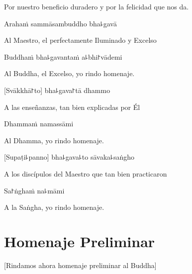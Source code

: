 \begin{english}
Por nuestro beneficio duradero y por la felicidad que nos da.
\end{english}

\clearpage

Arahaṁ sammāsambuddho bha꜕gavā

\begin{english}
Al Maestro, el perfectamente Iluminado y Excelso
\end{english}

Buddhaṁ bha꜕gavantaṁ a꜕bhi꜓vādemi

\begin{english}
  Al Buddha, el Excelso, yo rindo homenaje.
\end{english}

[Svākkhā꜓to] bha꜕gava꜓tā dhammo

\begin{english}
 A las enseñanzas, tan bien explicadas por Él 
\end{english}

Dhammaṁ namassāmi

\begin{english}
  Al Dhamma, yo rindo homenaje.
\end{english}

[Supaṭi꜕panno] bha꜕gava꜕to sāvaka꜕saṅgho

\begin{english}
A los discípulos del Maestro que tan bien practicaron
\end{english}

Sa꜓ṅghaṁ na꜕māmi

\begin{english}
  A la Saṅgha, yo rindo homenaje.
\end{english}

\chapter{Homenaje Preliminar}

\begin{leader}
\end{leader}

\begin{english}
  [Rindamos ahora homenaje preliminar al Buddha]
\end{english}

